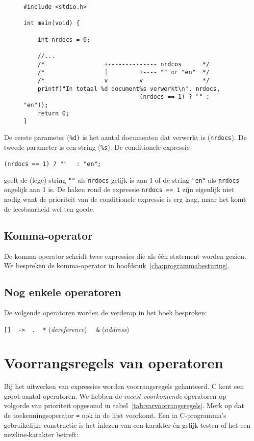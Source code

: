 \begin{figure}[!ht]
\begin{lstlisting}[caption=Het afdrukken van een meervoudsvorm.,label=cod:varnrdocs]
#include <stdio.h>

int main(void) {

    int nrdocs = 0;

    //...
    /*                 +-------------- nrdcos      */
    /*                 |         +---- "" or "en"  */
    /*                 v         v                 */
    printf("In totaal %d document%s verwerkt\n", nrdocs,
                                 (nrdocs == 1) ? "" : "en"));
    return 0;
}
\end{lstlisting}
\end{figure} 

De eerste parameter (\texttt{\%d)} is het aantal documenten dat verwerkt is (\texttt{nrdocs}). De tweede parameter is een string (\texttt{\%s}). De conditionele expressie

\hspace*{1em}\lstinline[basicstyle=\ttfamily]|(nrdocs == 1) ? "" | \lstinline[basicstyle=\ttfamily]| : "en";|

geeft de (lege) string \lstinline[basicstyle=\ttfamily]|""| als \texttt{nrdocs} gelijk is aan 1 of de string \lstinline[basicstyle=\ttfamily]|"en"| als \texttt{nrdocs} ongelijk aan 1 is. De haken rond de expressie \texttt{nrdocs == 1} zijn eigenlijk niet nodig want de prioriteit van de conditionele expressie is erg laag, maar het komt de leesbaarheid wel ten goede.

\subsection{Komma-operator}
De komma-operator scheidt twee expressies die als één statement worden gezien. We bespreken de komma-operator in hoofdstuk~\ref{cha:programmabesturing}.

\subsection{Nog enkele operatoren}
De volgende operatoren worden de verderop in het boek besproken:

\hspace*{1cm}\texttt{[]\ \ ->\ \ .\ \ *} (\textsl{dereference}) \texttt{\ \ \&} (\textsl{address})

\section{Voorrangsregels van operatoren}
Bij het uitwerken van expressies worden voorrangsregels gehanteerd. C kent een groot aantal operatoren. We hebben de \textsl{meest voorkomende} operatoren op volgorde van prioriteit opgesomd in tabel~\ref{tab:varvoorrangsregels}. Merk op dat de toekenningsoperator \texttt{=} ook in de lijst voorkomt. Een in C-programma's gebruikelijke constructie is het inlezen van een karakter én gelijk testen of het een newline-karakter betreft:

